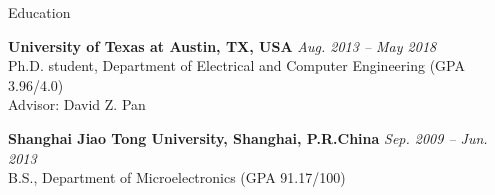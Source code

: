 

\begin{rSection}{Education}


{\bf University of Texas at Austin, TX, USA} \hfill {\em Aug. 2013 -- May 2018} \\ 
Ph.D. student, Department of Electrical and Computer Engineering (GPA 3.96/4.0) \\
Advisor: David Z. Pan 

{\bf Shanghai Jiao Tong University, Shanghai, P.R.China} \hfill {\em Sep. 2009 -- Jun. 2013} \\ 
B.S., Department of Microelectronics (GPA 91.17/100) 

\end{rSection}

